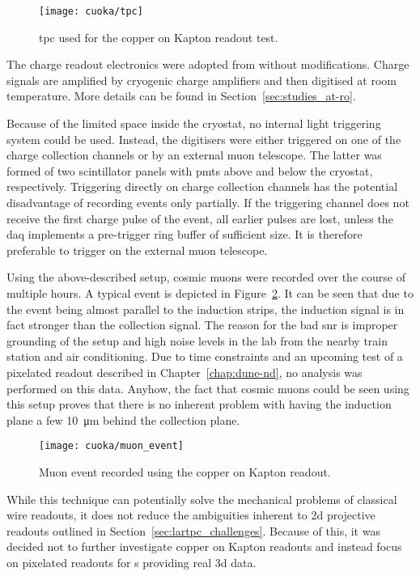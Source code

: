 \begin{figure}[htb]
	\centering
	\texttt{[image: cuoka/tpc]}
	\caption[Copper on Kapton test ]{%
		\acrshort{tpc} used for the copper on Kapton readout test.
	}
	\label{fig:cuoka_tpc}
\end{figure}

The charge readout electronics were adopted from \AT{} without modifications.
Charge signals are amplified by cryogenic charge amplifiers and then digitised at room temperature.
More details can be found in Section~\ref{sec:studies_at-ro}.

Because of the limited space inside the cryostat, no internal light triggering system could be used.
Instead, the digitisers were either triggered on one of the charge collection channels or by an external muon telescope.
The latter was formed of two scintillator panels with \glspl{pmt} above and below the cryostat, respectively.
Triggering directly on charge collection channels has the potential disadvantage of recording events only partially.
If the triggering channel does not receive the first charge pulse of the event, all earlier pulses are lost, unless the \gls{daq} implements a pre-trigger ring buffer of sufficient size.
It is therefore preferable to trigger on the external muon telescope.

Using the above-described setup, cosmic muons were recorded over the course of multiple hours.
A typical event is depicted in Figure~\ref{fig:cuoka_event}.
It can be seen that due to the event being almost parallel to the induction strips, the induction signal is in fact stronger than the collection signal.
The reason for the bad \gls{snr} is improper grounding of the setup and high noise levels in the lab from the nearby train station and air conditioning.
Due to time constraints and an upcoming test of a pixelated readout described in Chapter~\ref{chap:dune-nd}, no analysis was performed on this data.
Anyhow, the fact that cosmic muons could be seen using this setup proves that there is no inherent problem with having the induction plane a few \SI{10}{\micro\metre} behind the collection plane.

\begin{figure}[htb]
	\centering
	\texttt{[image: cuoka/muon\_event]}
	\caption[Copper on Kapton test muon event]{%
		Muon event recorded using the copper on Kapton readout.
	}
	\label{fig:cuoka_event}
\end{figure}

While this technique can potentially solve the mechanical problems of classical wire readouts, it does not reduce the ambiguities inherent to \gls{2d} projective readouts outlined in Section~\ref{sec:lartpc_challenges}.
Because of this, it was decided not to further investigate copper on Kapton readouts and instead focus on pixelated readouts for \lartpc{}s providing real \gls{3d} data.


